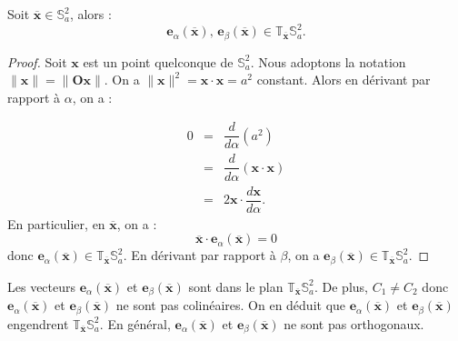 \begin{proposition}
Soit $\overline{\mathbf{x}} \in \mathbb{S}_a^2$, alors :
\begin{equation}
\mathbf{e}_{\alpha}(\overline{\mathbf{x}})\text{, } \mathbf{e}_{\beta}(\overline{\mathbf{x}}) \in \mathbb{T}_{\overline{\mathbf{x}}} \mathbb{S}_a^2.
\end{equation}
\end{proposition}


\begin{proof}
Soit $\mathbf{x}$ est un point quelconque de $\mathbb{S}_a^2$. Nous adoptons la notation $\| \mathbf{x} \|= \| \mathbf{Ox} \|$. On a $\| \mathbf{x} \|^2 = \mathbf{x} \cdot \mathbf{x} = a^2$ constant. Alors en dérivant par rapport à $\alpha$, on a :
 
\begin{equation*}
\begin{array}{rcl}
0 & = & \dfrac{d}{d \alpha} ( a^2 )\\
  & = & \dfrac{d}{d \alpha} ( \mathbf{x} \cdot \mathbf{x} )\\
  & = & 2 \mathbf{x} \cdot \dfrac{d \mathbf{x}}{d \alpha}.
\end{array}
\end{equation*}
En particulier, en $\overline{\mathbf{x}}$, on a :
\begin{equation}
\overline{\mathbf{x}} \cdot \mathbf{e}_{\alpha}(\overline{\mathbf{x}}) = 0
\end{equation}
donc $\mathbf{e}_{\alpha}(\overline{\mathbf{x}}) \in \mathbb{T}_{\overline{\mathbf{x}}} \mathbb{S}_a^2$. En dérivant par rapport à $\beta$, on a $\mathbf{e}_{\beta}(\overline{\mathbf{x}}) \in \mathbb{T}_{\overline{\mathbf{x}}} \mathbb{S}_a^2$.
\end{proof}

Les vecteurs $\mathbf{e}_{\alpha}(\overline{\mathbf{x}})$ et $\mathbf{e}_{\beta}(\overline{\mathbf{x}})$ sont dans le plan $\mathbb{T}_{\overline{\mathbf{x}}}\mathbb{S}_a^2$. De plus, $C_1 \neq C_2$ donc $\mathbf{e}_{\alpha}(\overline{\mathbf{x}})$ et $\mathbf{e}_{\beta}(\overline{\mathbf{x}})$ ne sont pas colinéaires. On en déduit que $\mathbf{e}_{\alpha}(\overline{\mathbf{x}})$ et $\mathbf{e}_{\beta}(\overline{\mathbf{x}})$ engendrent $\mathbb{T}_{\overline{\mathbf{x}}} \mathbb{S}_a^2$. En général, $\mathbf{e}_{\alpha}(\overline{\mathbf{x}})$ et $\mathbf{e}_{\beta}(\overline{\mathbf{x}})$ ne sont pas orthogonaux.

